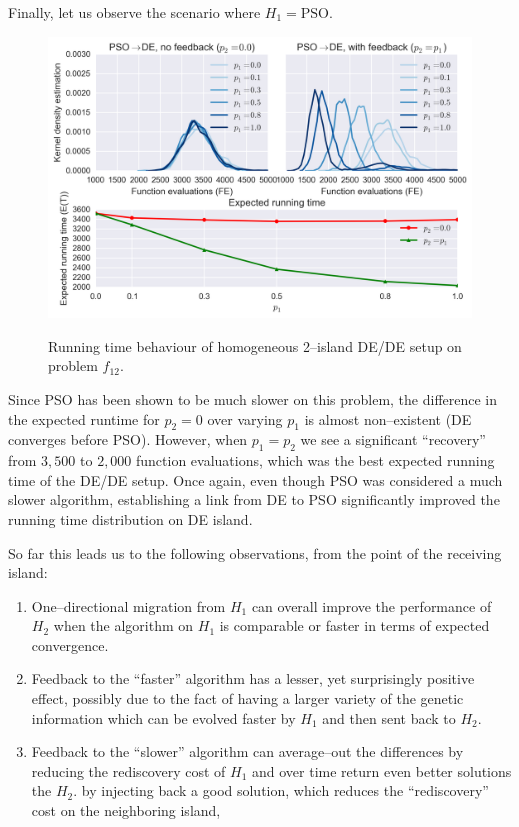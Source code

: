 \documentclass{sig-alternate}
\begin{document}
Finally, let us observe the scenario where $H_1 = \mbox{PSO}$.
\begin{figure}[ht]
  \centering
  \includegraphics[width=\columnwidth]{figures/single_pso_jde_cec_7.png}
  \label{fig:single_pso_jde_7}
 \caption{Running time behaviour of homogeneous 2--island DE/DE setup on problem $f_{12}$.}
\end{figure}
Since PSO has been shown to be much slower on this problem, the difference in the expected runtime for $p_2=0$ over varying $p_1$ is almost non--existent (DE converges before PSO).
However, when $p_1=p_2$ we see a significant ``recovery'' from $3,500$ to $2,000$ function evaluations, which was the best expected running time of the DE/DE setup.
Once again, even though PSO was considered a much slower algorithm, establishing a link from DE to PSO significantly improved the running time distribution on DE island.

So far this leads us to the following observations, from the point of the receiving island:
\begin{enumerate}
    \item One--directional migration from $H_1$ can overall improve the performance of $H_2$ when the algorithm on $H_1$ is comparable or faster in terms of expected convergence.
    \item Feedback to the ``faster'' algorithm has a lesser, yet surprisingly positive effect, possibly due to the fact of having a larger variety of the genetic information which can be evolved faster by $H_1$ and then sent back to $H_2$.
    \item Feedback to the ``slower'' algorithm can average--out the differences by reducing the rediscovery cost of $H_1$ and over time return even better solutions the $H_2$.
        by injecting back a good solution, which reduces the ``rediscovery'' cost on the neighboring island,
\end{enumerate}
\end{document}
